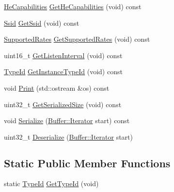 \begin{DoxyCompactItemize}
\hyperlink{classns3_1_1HeCapabilities}{He\+Capabilities} \hyperlink{classns3_1_1MgtAssocRequestHeader_ac59870e0083f61b3d9037442665ffd33}{Get\+He\+Capabilities} (void) const 
\item 
\hyperlink{classns3_1_1Ssid}{Ssid} \hyperlink{classns3_1_1MgtAssocRequestHeader_a26b586ed23728dcb908daf96c3f69a00}{Get\+Ssid} (void) const 
\item 
\hyperlink{classns3_1_1SupportedRates}{Supported\+Rates} \hyperlink{classns3_1_1MgtAssocRequestHeader_a973d3f77d8d8b0e28cfa4535d259dd5a}{Get\+Supported\+Rates} (void) const 
\item 
uint16\+\_\+t \hyperlink{classns3_1_1MgtAssocRequestHeader_a80e2c4726f042490dfea03a8bdea17a9}{Get\+Listen\+Interval} (void) const 
\item 
\hyperlink{classns3_1_1TypeId}{Type\+Id} \hyperlink{classns3_1_1MgtAssocRequestHeader_ac0a19938764e0d2f08b804130fb34e98}{Get\+Instance\+Type\+Id} (void) const 
\item 
void \hyperlink{classns3_1_1MgtAssocRequestHeader_a39d1fd840f5cb77bcbdb6d613bf267dd}{Print} (std\+::ostream \&os) const 
\item 
uint32\+\_\+t \hyperlink{classns3_1_1MgtAssocRequestHeader_a8cc698d3c008a4c5f92a9959c9038de2}{Get\+Serialized\+Size} (void) const 
\item 
void \hyperlink{classns3_1_1MgtAssocRequestHeader_a5af209ceffdc8e66f29efe0aed867c6e}{Serialize} (\hyperlink{classns3_1_1Buffer_1_1Iterator}{Buffer\+::\+Iterator} start) const 
\item 
uint32\+\_\+t \hyperlink{classns3_1_1MgtAssocRequestHeader_a660806ee6d8ccb5ee7d1790506770e45}{Deserialize} (\hyperlink{classns3_1_1Buffer_1_1Iterator}{Buffer\+::\+Iterator} start)
\end{DoxyCompactItemize}
\subsection*{Static Public Member Functions}
\begin{DoxyCompactItemize}
\item 
static \hyperlink{classns3_1_1TypeId}{Type\+Id} \hyperlink{classns3_1_1MgtAssocRequestHeader_a263690a91a24470aa3f704b58860b838}{Get\+Type\+Id} (void)
\end{DoxyCompactItemize}
